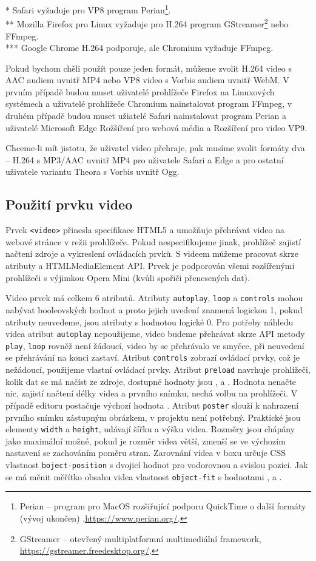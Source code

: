 * Safari vyžaduje pro VP8 program Perian\footnote{Perian -- program pro MacOS rozšiřující podporu QuickTime o další formáty (vývoj ukončen) ,\url{https://www.perian.org/}.}.\\
** Mozilla Firefox pro Linux vyžaduje pro H.264 program GStreamer\footnote{GStreamer -- otevřený multiplatformní multimediální framework, \url{https://gstreamer.freedesktop.org/}.} nebo FFmpeg.\\
*** Google Chrome H.264 podporuje, ale Chromium vyžaduje FFmpeg.
\medskip

Pokud bychom chěli použít pouze jeden formát, můžeme zvolit H.264 video s AAC audiem uvnitř MP4 nebo VP8 video s Vorbis audiem uvnitř WebM. V prvním případě budou muset uživatelé prohlížeče Firefox na Linuxových systémech a uživatelé prohlížeče Chromium nainstalovat program FFmpeg, v druhém případě budou muset užiatelé Safari nainstalovat program Perian a uživatelé Microsoft Edge Rožšíření pro webová média a Rozšíření pro video VP9.

Chceme-li mít jistotu, že uživatel video přehraje, pak musíme zvolit formáty dva -- H.264 s MP3/AAC uvnitř MP4 pro uživatele Safari a Edge a pro ostatní uživatele variantu Theora s Vorbis uvnitř Ogg.

\subsection{Použití prvku video}
Prvek \texttt{<video>} přinesla specifikace HTML5 a umožňuje přehrávat video na webové stránce v režii prohlížeče. Pokud nespecifikujeme jinak, prohlížeč zajistí načtení zdroje a vykreslení ovládacích prvků. S videem můžeme pracovat skrze atributy a HTMLMediaElement API. Prvek je podporován všemi rozšířenými prohlížeči s výjimkou Opera Mini (kvůli spořiči přenesených dat).

Video prvek má celkem 6 atributů. Atributy \texttt{autoplay}, \texttt{loop} a \texttt{controls} mohou nabývat booleovských hodnot a proto jejich uvedení znamená logickou 1, pokud atributy neuvedeme, jsou atributy s hodnotou logické 0. Pro potřeby náhledu videa atribut \texttt{autoplay} nepoužijeme, video budeme přehrávat skrze API metody \texttt{play}, \texttt{loop} rovněž není žádoucí, video by se přehrávalo ve smyčce, při neuvedení se přehrávání na konci zastaví. Atribut \texttt{controls} zobrazí ovládací prvky, což je nežádoucí, použijeme vlastní ovládací prvky. Atribut \texttt{preload} navrhuje prohlížeči, kolik dat se má načíst ze zdroje, dostupné hodnoty jsou ,  a . Hodnota  nenačte nic,  zajistí načtení délky videa a prvního snímku,  nechá volbu na prohlížeči. V případě editoru postačuje výchozí hodnota . Atribut \texttt{poster} slouží k nahrazení prvního snímku zástupným obrázkem, v projektu není potřebný. Praktické jsou elementy \texttt{width} a \texttt{height}, udávají šířku a výšku videa. Rozměry jsou chápány jako maximální možné, pokud je rozměr videa větší, zmenší se ve výchozím nastavení se zachováním poměru stran. Zarovnání videa v boxu určuje CSS vlastnost \texttt{boject-position} s dvojicí hodnot pro vodorovnou a svislou pozici. Jak se má měnit měřítko obsahu videa vlastnost \texttt{object-fit} s hodnotami ,  a .

